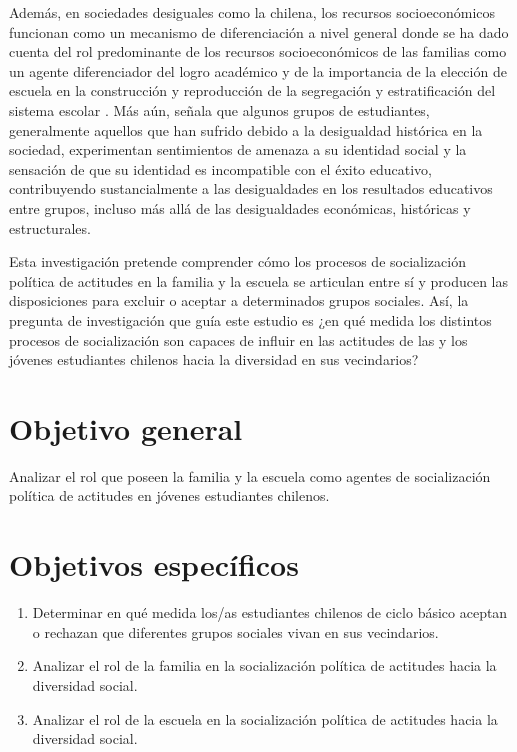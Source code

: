 \documentclass[12pt,twoside]{templates/facsothesis}
\begin{document}
Además, en sociedades desiguales como la chilena, los recursos socioeconómicos funcionan como un mecanismo de diferenciación a nivel general donde se ha dado cuenta del rol predominante de los recursos socioeconómicos de las familias como un agente diferenciador del logro académico \citep{bellei_estudio_2013} y de la importancia de la elección de escuela en la construcción y reproducción de la segregación y estratificación del sistema escolar \citep{hernandez_eleccion_2015}. Más aún, \citet{easterbrook_tackling_2021} señala que algunos grupos de estudiantes, generalmente aquellos que han sufrido debido a la desigualdad histórica en la sociedad, experimentan sentimientos de amenaza a su identidad social y la sensación de que su identidad es incompatible con el éxito educativo, contribuyendo sustancialmente a las desigualdades en los resultados educativos entre grupos, incluso más allá de las desigualdades económicas, históricas y estructurales.

Esta investigación pretende comprender cómo los procesos de socialización política de actitudes en la familia y la escuela se articulan entre sí y producen las disposiciones para excluir o aceptar a determinados grupos sociales. Así, la pregunta de investigación que guía este estudio es ¿en qué medida los distintos procesos de socialización son capaces de influir en las actitudes de las y los jóvenes estudiantes chilenos hacia la diversidad en sus vecindarios?

\hypertarget{objetivo-general}{%
\section{Objetivo general}\label{objetivo-general}}

Analizar el rol que poseen la familia y la escuela como agentes de socialización política de actitudes en jóvenes estudiantes chilenos.

\hypertarget{objetivos-especuxedficos}{%
\section{Objetivos específicos}\label{objetivos-especuxedficos}}

\begin{enumerate}
\def\labelenumi{\arabic{enumi}.}
\item
  Determinar en qué medida los/as estudiantes chilenos de ciclo básico aceptan o rechazan que diferentes grupos sociales vivan en sus vecindarios.
\item
  Analizar el rol de la familia en la socialización política de actitudes hacia la diversidad social.
\item
  Analizar el rol de la escuela en la socialización política de actitudes hacia la diversidad social.
\end{enumerate}
\end{document}
